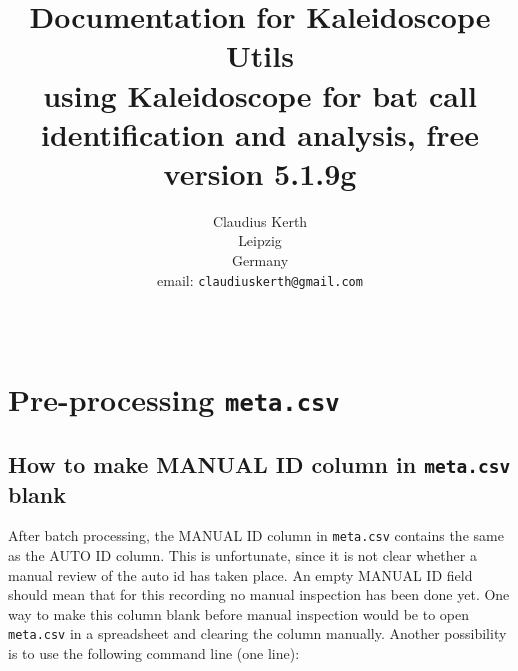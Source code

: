 \documentclass[English, 11pt, twoside, authoryear]{article}
\begin{document}
%
\title{ Documentation for \textsf{Kaleidoscope Utils}  \\
\vspace{20pt}
\normalsize{using \textsf{Kaleidoscope} for bat call identification and analysis, free version 5.1.9g}\vspace{100pt}
}

%
%
\author{Claudius Kerth\\Leipzig\\Germany\\email: \texttt{claudiuskerth@gmail.com}}
%
%
\date{~} %
%
%
%
%
%
%
\maketitle
%

\thispagestyle{empty} %
%
%
\tableofcontents %
%
%
\clearpage %
\setcounter{page}{1} %
%
%
%
%
%
\onecolumn


%
%
%
\section{Pre-processing \texttt{meta.csv}}

%
%
%
\subsection{How to make MANUAL ID column in \texttt{meta.csv} blank}
%
%
%
After batch processing, the MANUAL ID column in \texttt{meta.csv} contains the same as the AUTO ID column. This is unfortunate, since it is not clear whether a manual review of the auto id has taken place. An empty MANUAL ID field should mean that for this recording no manual inspection has been done yet. One way to make this column blank before manual inspection would be to open \texttt{meta.csv} in a spreadsheet and clearing the column manually. Another possibility is to use the following command line (one line):
\end{document}
